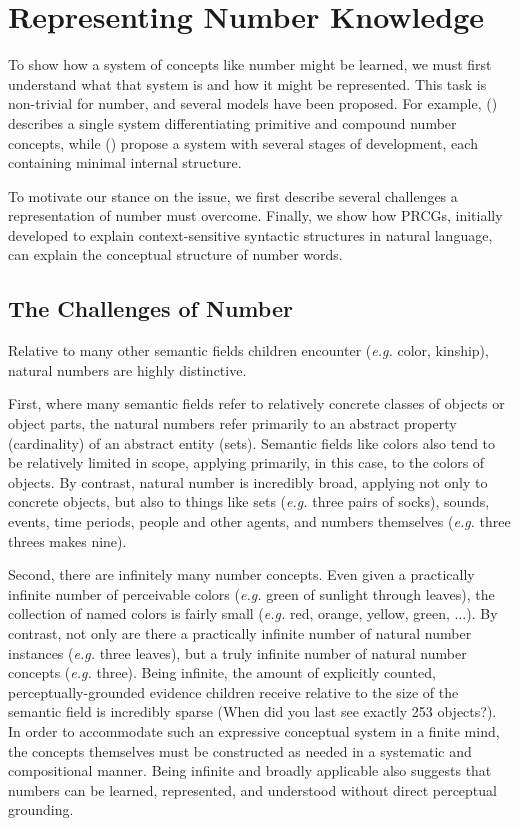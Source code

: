 \documentclass[10pt,letterpaper]{article}
\begin{document}
\section{Representing Number Knowledge}

To show how a system of concepts like number might be learned, we must
first understand what that system is and how it might be represented.
This task is non-trivial for number, and several models have been
proposed. For example, \citeauthor{hurford1975linguistic}
(\citeyear{hurford1975linguistic}) describes a single system
differentiating primitive and compound number concepts, while
\citeauthor{siegler1982development}
(\citeyear{siegler1982development}) propose a system with several
stages of development, each containing minimal internal structure.

To motivate our stance on the issue, we first describe several
challenges a representation of number must overcome. Finally, we show
how PRCGs, initially developed to explain context-sensitive syntactic
structures in natural language, can explain the conceptual structure
of number words.

\subsection{The Challenges of Number}

Relative to many other semantic fields children encounter ({\it e.g.}
color, kinship), natural numbers are highly distinctive.

First, where many semantic fields refer to relatively concrete classes
of objects or object parts, the natural numbers refer primarily to an
abstract property (cardinality) of an abstract entity (sets). Semantic
fields like colors also tend to be relatively limited in scope,
applying primarily, in this case, to the colors of objects. By
contrast, natural number is incredibly broad, applying not only to
concrete objects, but also to things like sets ({\it e.g.} three pairs
of socks), sounds, events, time periods, people and other agents, and
numbers themselves ({\it e.g.} three threes makes nine).

Second, there are infinitely many number concepts. Even given a
practically infinite number of perceivable colors ({\it e.g.} green of
sunlight through leaves), the collection of named colors is fairly
small ({\it e.g.} red, orange, yellow, green, ...). By contrast, not
only are there a practically infinite number of natural number
instances ({\it e.g.} three leaves), but a truly infinite number of
natural number concepts ({\it e.g.} three). Being infinite, the amount
of explicitly counted, perceptually-grounded evidence children receive
relative to the size of the semantic field is incredibly sparse (When
did you last see exactly 253 objects?). In order to accommodate such
an expressive conceptual system in a finite mind, the concepts
themselves must be constructed as needed in a systematic and
compositional manner. Being infinite and broadly applicable also
suggests that numbers can be learned, represented, and understood
without direct perceptual grounding.
\end{document}
